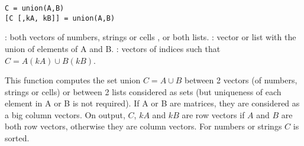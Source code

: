 
\begin{mandesc}
\end{mandesc}

\begin{calling_sequence}
\begin{verbatim}
C = union(A,B)
[C [,kA, kB]] = union(A,B)
\end{verbatim}
\end{calling_sequence}
\begin{parameters}
  \begin{varlist}
     : both vectors of numbers, strings or cells , or both lists.
     : vector or list with the union of elements of A and B.
     : vectors of indices such that $C = A(kA) \cup B(kB)$.
  \end{varlist}
\end{parameters}

\begin{mandescription}
  This function computes the set union $C = A \cup B$
  between 2 vectors (of numbers, strings or cells) or between 2
  lists considered as sets (but uniqueness of each element in A or B is not
  required). If A or B are matrices, they are considered as a big column vectors.
  On output, $C$, $kA$ and $kB$ are row vectors if  $A$ and $B$ are both row vectors, otherwise they
  are column vectors. For numbers or strings $C$ is sorted.
\end{mandescription}

